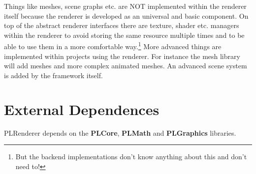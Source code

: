 Things like meshes, scene graphs etc. are NOT implemented within the renderer itself because the renderer is developed as an universal and basic component. On top of the abstract renderer interfaces there are texture, shader etc. managers within the renderer to avoid storing the same resource multiple times and to be able to use them in a more comfortable way.\footnote{But the backend implementations don't know anything about this and don't need to!} More advanced things are implemented within projects using the renderer. For instance the mesh library will add meshes and more complex animated meshes. An advanced scene system is added by the framework itself.




\section{External Dependences}
PLRenderer depends on the \textbf{PLCore}, \textbf{PLMath} and \textbf{PLGraphics} libraries.
